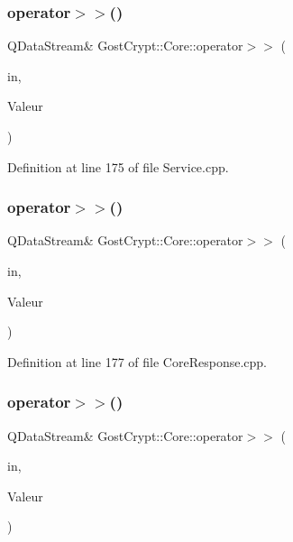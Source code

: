 \subsubsection{\texorpdfstring{operator$>$$>$()}{operator>>()}\hspace{0.1cm}{\footnotesize\ttfamily [28/56]}}
{\footnotesize\ttfamily Q\+Data\+Stream\& Gost\+Crypt\+::\+Core\+::operator$>$$>$ (\begin{DoxyParamCaption}\item[{Q\+Data\+Stream \&}]{in,  }\item[{\hyperlink{struct_gost_crypt_1_1_core_1_1_init_response}{Init\+Response} \&}]{Valeur }\end{DoxyParamCaption})}



Definition at line 175 of file Service.\+cpp.

\mbox{\label{namespace_gost_crypt_1_1_core_ae6407183fa1e4e8da35cc75529616661}} 
\subsubsection{\texorpdfstring{operator$>$$>$()}{operator>>()}\hspace{0.1cm}{\footnotesize\ttfamily [29/56]}}
{\footnotesize\ttfamily Q\+Data\+Stream\& Gost\+Crypt\+::\+Core\+::operator$>$$>$ (\begin{DoxyParamCaption}\item[{Q\+Data\+Stream \&}]{in,  }\item[{\hyperlink{struct_gost_crypt_1_1_core_1_1_get_derivation_functions_response}{Get\+Derivation\+Functions\+Response} \&}]{Valeur }\end{DoxyParamCaption})}



Definition at line 177 of file Core\+Response.\+cpp.

\mbox{\label{namespace_gost_crypt_1_1_core_af919152c08eeea79b59f2628649cf266}} 
\subsubsection{\texorpdfstring{operator$>$$>$()}{operator>>()}\hspace{0.1cm}{\footnotesize\ttfamily [30/56]}}
{\footnotesize\ttfamily Q\+Data\+Stream\& Gost\+Crypt\+::\+Core\+::operator$>$$>$ (\begin{DoxyParamCaption}\item[{Q\+Data\+Stream \&}]{in,  }\item[{\hyperlink{class_gost_crypt_1_1_core_1_1_failed_detach_loop_device}{Gost\+Crypt\+::\+Core\+::\+Failed\+Detach\+Loop\+Device} \&}]{Valeur }\end{DoxyParamCaption})}



